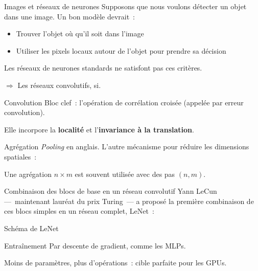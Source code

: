 \begin{frame}{Images et réseaux de neurones}
  Supposons que nous voulons détecter un objet dans une image. Un bon modèle devrait~:
  \begin{itemize}
    \item Trouver l'objet où qu'il soit dans l'image
    \item Utiliser les pixels locaux autour de l'objet pour prendre sa décision
  \end{itemize}

  Les réseaux de neurones standards ne satisfont pas ces critères.

  $\Rightarrow$ Les réseaux convolutifs, si.
\end{frame}

\begin{frame}{Convolution}
  Bloc clef~: l'opération de corrélation croisée (appelée par erreur convolution).

  Elle incorpore la \textbf{localité} et l'\textbf{invariance à la translation}.

\end{frame}

\begin{frame}{Agrégation}
  \textit{Pooling} en anglais. L'autre mécanisme pour réduire les dimensions spatiales~:


  Une agrégation $n \times m$ est souvent utilisée avec des pas $(n, m)$.
\end{frame}

\begin{frame}{Combinaison des blocs de base en un réseau convolutif}
  Yann LeCun ---~maintenant lauréat du prix Turing~--- a proposé la première combinaison de ces blocs simples en un réseau complet, LeNet~:

\end{frame}

\begin{frame}{Schéma de LeNet}
\end{frame}

\begin{frame}{Entraînement}
  Par descente de gradient, comme les MLPs.

  Moins de paramètres, plus d'opérations~: cible parfaite pour les GPUs.

\end{frame}

